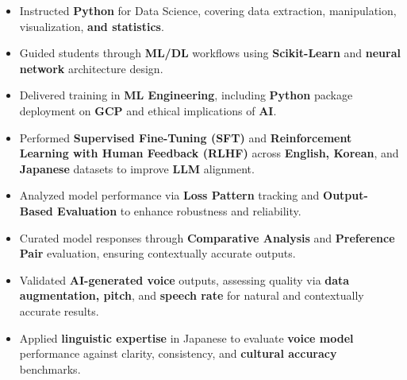 \documentclass[10pt,a4paper,ragged2e,withhyper]{altacv}
\begin{document}
\begin{itemize}
\item Instructed {\bf Python} for Data Science, covering data extraction, manipulation, visualization, {\bf and statistics}.
\item Guided students through {\bf ML/DL} workflows using {\bf Scikit-Learn} and {\bf neural network} architecture design.
\item Delivered training in {\bf ML Engineering}, including {\bf Python} package deployment on {\bf GCP} and ethical implications of {\bf AI}.
\end{itemize}
\divider


\begin{itemize}
\item Performed {\bf Supervised Fine-Tuning (SFT)} and {\bf Reinforcement Learning with Human Feedback (RLHF)} across {\bf English, Korean}, and {\bf Japanese} datasets to improve {\bf LLM} alignment.
\item Analyzed model performance via {\bf Loss Pattern} tracking and {\bf Output-Based Evaluation} to enhance robustness and reliability.
\item Curated model responses through {\bf Comparative Analysis} and {\bf Preference Pair} evaluation, ensuring contextually accurate outputs.
\end{itemize}
\divider


\begin{itemize}
\item Validated {\bf AI-generated voice} outputs, assessing quality via {\bf data augmentation, pitch}, and {\bf speech rate} for natural and contextually accurate results.
\item Applied {\bf linguistic expertise} in Japanese to evaluate {\bf voice model} performance against clarity, consistency, and {\bf cultural accuracy} benchmarks.
\end{itemize}
\divider
\end{document}
